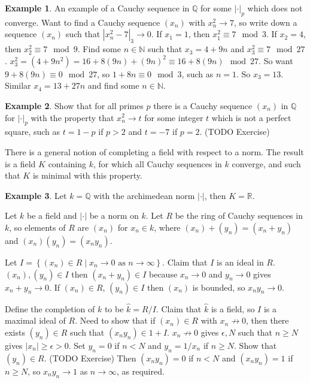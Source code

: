 \documentclass{article}
\newcommand{\N}{\mathbb{N}}
\newcommand{\Q}{\mathbb{Q}}
\newcommand{\R}{\mathbb{R}}
\newcommand{\rb}[1]{\left( #1 \right)}
\newcommand{\cb}[1]{\left\{ #1 \right\}}
\newcommand{\abs}[1]{\left\lvert #1 \right\rvert}
\theoremstyle{definition}\newtheorem{definition}{Definition}[section]
\theoremstyle{definition}\newtheorem{remark}[definition]{Remark}
\theoremstyle{definition}\newtheorem*{example}{Example}
\theoremstyle{definition}\newtheorem*{note}{Note}
\begin{document}
\begin{example}
An example of a Cauchy sequence in $ \Q $ for some $ \abs{\cdot}_p $ which does not converge. Want to find a Cauchy sequence $ \rb{x_n} $ with $ x_n^2 \to 7 $, so write down a sequence $ \rb{x_n} $ such that $ \abs{x_n^2 - 7}_3 \to 0 $. If $ x_1 = 1 $, then $ x_1^2 \equiv 7 \mod 3 $. If $ x_2 = 4 $, then $ x_2^2 \equiv 7 \mod 9 $. Find some $ n \in \N $ such that $ x_3 = 4 + 9n $ and $ x_3^2 \equiv 7 \mod 27 $. $ x_3^2 = \rb{4 + 9n^2} = 16 + 8\rb{9n} + \rb{9n}^2 \equiv 16 + 8\rb{9n} \mod 27 $. So want $ 9 + 8\rb{9n} \equiv 0 \mod 27 $, so $ 1 + 8n \equiv 0 \mod 3 $, such as $ n = 1 $. So $ x_3 = 13 $. Similar $ x_4 = 13 + 27n $ and find some $ n \in \N $.
\end{example}

\begin{example}
Show that for all primes $ p $ there is a Cauchy sequence $ \rb{x_n} $ in $ \Q $ for $ \abs{\cdot}_p $ with the property that $ x_n^2 \to t $ for some integer $ t $ which is not a perfect square, such as $ t = 1 - p $ if $ p > 2 $ and $ t = -7 $ if $ p = 2 $. (TODO Exercise)
\end{example}

There is a general notion of completing a field with respect to a norm. The result is a field $ K $ containing $ k $, for which all Cauchy sequences in $ k $ converge, and such that $ K $ is minimal with this property.

\begin{example}
Let $ k = \Q $ with the archimedean norm $ \abs{\cdot} $, then $ K = \R $.
\end{example}


Let $ k $ be a field and $ \abs{\cdot} $ be a norm on $ k $. Let $ R $ be the ring of Cauchy sequences in $ k $, so elements of $ R $ are $ \rb{x_n} $ for $ x_n \in k $, where $ \rb{x_n} + \rb{y_n} = \rb{x_n + y_n} $ and $ \rb{x_n}\rb{y_n} = \rb{x_ny_n} $.

Let $ I = \cb{\rb{x_n} \in R \mid x_n \to 0 \text{ as } n \to \infty} $. Claim that $ I $ is an ideal in $ R $. $ \rb{x_n}, \rb{y_n} \in I $ then $ \rb{x_n + y_n} \in I $ because $ x_n \to 0 $ and $ y_n \to 0 $ gives $ x_n + y_n \to 0 $. If $ \rb{x_n} \in R $, $ \rb{y_n} \in I $ then $ \rb{x_n} $ is bounded, so $ x_ny_n \to 0 $.

Define the completion of $ k $ to be $ \widehat{k} = R / I $. Claim that $ \widehat{k} $ is a field, so $ I $ is a maximal ideal of $ R $. Need to show that if $ \rb{x_n} \in R $ with $ x_n \not\to 0 $, then there exists $ \rb{y_n} \in R $ such that $ \rb{x_ny_n} \in 1 + I $. $ x_n \not\to 0 $ gives $ \epsilon, N $ such that $ n \ge N $ gives $ \abs{x_n} \ge \epsilon > 0 $. Set $ y_n = 0 $ if $ n < N $ and $ y_n = 1 / x_n $ if $ n \ge N $. Show that $ \rb{y_n} \in R $. (TODO Exercise) Then $ \rb{x_ny_n} = 0 $ if $ n < N $ and $ \rb{x_ny_n} = 1 $ if $ n \ge N $, so $ x_ny_n \to 1 $ as $ n \to \infty $, as required.
\end{document}
